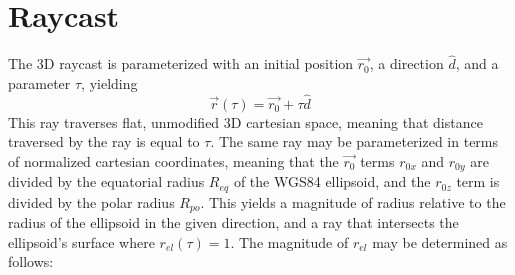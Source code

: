 \documentclass[aps,ams,prl,twocolumn,superscriptaddress,10pt]{revtex4-1}
\begin{document}
\section{Raycast}
The 3D raycast is parameterized with an initial position $\vec{r_0}$, a direction $\hat{d}$, and a parameter $\tau$, yielding
\begin{equation}\label{eqn:r_of_tau}
 \vec{r}(\tau) = \vec{r_0} + \tau \hat{d}
\end{equation}
This ray traverses flat, unmodified 3D cartesian space, meaning that distance traversed by the ray is equal to $\tau$.
The same ray may be parameterized in terms of normalized cartesian coordinates,
meaning that the $\vec{r_0}$ terms $r_{0x}$ and $r_{0y}$ are divided by the equatorial radius $R_{eq}$ of the WGS84 ellipsoid,
and the $r_{0z}$ term is divided by the polar radius $R_{po}$.
This yields a magnitude of radius relative to the radius of the ellipsoid in the given direction, and a ray that intersects the ellipsoid's surface
where $r_{el}(\tau) = 1$.
The magnitude of $r_{el}$ may be determined as follows:
\end{document}
